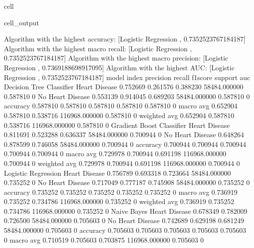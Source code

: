 \documentclass[letterpaper,10pt,english]{jupyterBook}
\begin{document}
\begin{sphinxuseclass}{cell}
\begin{sphinxVerbatimOutput}
\begin{sphinxuseclass}{cell_output}
\begin{sphinxVerbatim}[commandchars=\\\{\}]
Algorithm with the highest accuracy: [\PYGZsq{}Logistic Regression \PYGZsq{}, 0.7352523767184187]
Algorithm with the highest macro recall:
        [\PYGZsq{}Logistic Regression \PYGZsq{}, 0.7352523767184187]
Algorithm with the highest macro precision:
        [\PYGZsq{}Logistic Regression \PYGZsq{}, 0.7369188698917095]
Algorithm with the highest AUC:
        [\PYGZsq{}Logistic Regression \PYGZsq{}, 0.7352523767184187]
model                      index             precision  recall    f1\PYGZhy{}score  support        auc     
Decision Tree Classifier   Heart Disease     0.752669   0.261576  0.388230  58484.000000   0.587810    0
                           No Heart Disease  0.553139   0.914045  0.689203  58484.000000   0.587810    0
                           accuracy          0.587810   0.587810  0.587810  0.587810       0.587810    0
                           macro avg         0.652904   0.587810  0.538716  116968.000000  0.587810    0
                           weighted avg      0.652904   0.587810  0.538716  116968.000000  0.587810    0
Gradient Boost Classifier  Heart Disease     0.811691   0.523288  0.636337  58484.000000   0.700944    0
                           No Heart Disease  0.648264   0.878599  0.746058  58484.000000   0.700944    0
                           accuracy          0.700944   0.700944  0.700944  0.700944       0.700944    0
                           macro avg         0.729978   0.700944  0.691198  116968.000000  0.700944    0
                           weighted avg      0.729978   0.700944  0.691198  116968.000000  0.700944    0
Logistic Regression        Heart Disease     0.756789   0.693318  0.723664  58484.000000   0.735252    0
                           No Heart Disease  0.717049   0.777187  0.745908  58484.000000   0.735252    0
                           accuracy          0.735252   0.735252  0.735252  0.735252       0.735252    0
                           macro avg         0.736919   0.735252  0.734786  116968.000000  0.735252    0
                           weighted avg      0.736919   0.735252  0.734786  116968.000000  0.735252    0
Naive Bayes                Heart Disease     0.678349   0.782009  0.726500  58484.000000   0.705603    0
                           No Heart Disease  0.742689   0.629198  0.681249  58484.000000   0.705603    0
                           accuracy          0.705603   0.705603  0.705603  0.705603       0.705603    0
                           macro avg         0.710519   0.705603  0.703875  116968.000000  0.705603    0

\end{sphinxVerbatim}
\end{sphinxuseclass}
\end{sphinxVerbatimOutput}
\end{sphinxuseclass}
\end{document}
